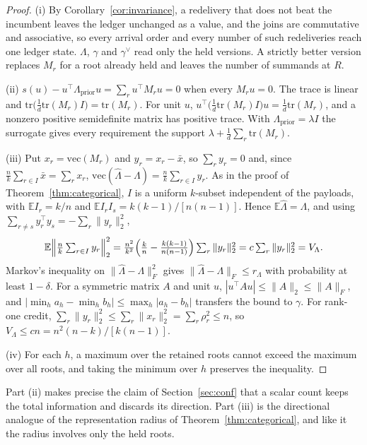 \documentclass{article}
\begin{document}
\begin{proof}
(i) By Corollary~\ref{cor:invariance}, a redelivery that does not beat the
incumbent leaves the ledger unchanged as a value, and the joins are commutative
and associative, so every arrival order and every number of such redeliveries
reach one ledger state. $\Lambda$, $\gamma$ and $\gamma^\vee$ read only the held
versions. A strictly better version replaces $M_r$ for a root already held and
leaves the number of summands at $R$.

(ii) $s(u)-u^\top\Lambda_{\text{prior}}u=\sum_ru^\top M_ru=0$ when every
$M_ru=0$. The trace is linear and
$\mathrm{tr}\bigl(\tfrac{1}{d}\mathrm{tr}(M_r)I\bigr)=\mathrm{tr}(M_r)$. For
unit $u$, $u^\top\bigl(\tfrac{1}{d}\mathrm{tr}(M_r)I\bigr)u=\tfrac{1}{d}
\mathrm{tr}(M_r)$, and a nonzero positive semidefinite matrix has positive
trace. With $\Lambda_{\text{prior}}=\lambda I$ the surrogate gives every
requirement the support $\lambda+\tfrac{1}{d}\sum_r\mathrm{tr}(M_r)$.

(iii) Put $x_r=\mathrm{vec}(M_r)$ and $y_r=x_r-\bar x$, so $\sum_ry_r=0$ and,
since $\tfrac{n}{k}\sum_{r\in I}\bar x=\sum_rx_r$,
$\mathrm{vec}(\hat\Lambda-\Lambda)=\tfrac{n}{k}\sum_{r\in I}y_r$. As in the
proof of Theorem~\ref{thm:categorical}, $I$ is a uniform $k$-subset independent
of the payloads, with $\mathbb{E}I_r=k/n$ and
$\mathbb{E}I_rI_s=k(k-1)/[n(n-1)]$. Hence $\mathbb{E}\hat\Lambda=\Lambda$, and
using $\sum_{r\ne s}y_r^\top y_s=-\sum_r\|y_r\|_2^2$,
\[
\mathbb{E}\Bigl\|\tfrac{n}{k}\textstyle\sum_{r\in I}y_r\Bigr\|_2^2
=\tfrac{n^2}{k^2}\Bigl(\tfrac{k}{n}-\tfrac{k(k-1)}{n(n-1)}\Bigr)
\textstyle\sum_r\|y_r\|_2^2=c\sum_r\|y_r\|_2^2=V_\Lambda .
\]
Markov's inequality on $\|\hat\Lambda-\Lambda\|_F^2$ gives
$\|\hat\Lambda-\Lambda\|_F\le r_\Lambda$ with probability at least $1-\delta$.
For a symmetric matrix $A$ and unit $u$,
$|u^\top Au|\le\|A\|_2\le\|A\|_F$, and
$|\min_ha_h-\min_hb_h|\le\max_h|a_h-b_h|$ transfers the bound to $\gamma$. For
rank-one credit, $\sum_r\|y_r\|_2^2\le\sum_r\|x_r\|_2^2=\sum_r\rho_r^2\le n$, so
$V_\Lambda\le cn=n^2(n-k)/[k(n-1)]$.

(iv) For each $h$, a maximum over the retained roots cannot exceed the maximum
over all roots, and taking the minimum over $h$ preserves the inequality.
\end{proof}

Part (ii) makes precise the claim of Section~\ref{sec:conf} that a scalar count
keeps the total information and discards its direction. Part (iii) is the
directional analogue of the representation radius of
Theorem~\ref{thm:categorical}, and like it the radius involves only the held
roots.
\end{document}
